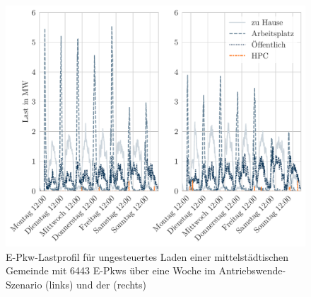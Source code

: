 \begin{figure}[H]
    \centering
    \includegraphics[width=\textwidth]{Bilder/example_load_profile}
    \caption{E-Pkw-Lastprofil für ungesteuertes Laden einer mittelstädtischen Gemeinde mit \num{6443} E-Pkws über eine Woche im Antriebswende-Szenario (links) und der \SzeFirmenparkplatz (rechts)}\label{fig:example_load_profile}
\end{figure}
